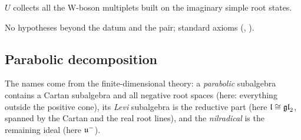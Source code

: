 \begin{physics}$U$ collects all the W-boson multiplets built on the imaginary simple root states.\end{physics}
\begin{status}No hypotheses beyond the datum and the pair; standard axioms (,
).\end{status}

\subsection{Parabolic decomposition}

The names come from the finite-dimensional theory: a \emph{parabolic} subalgebra contains a Cartan subalgebra and all
negative root spaces (here: everything outside the positive cone), its \emph{Levi} subalgebra is the reductive part
(here $\mathfrak{l}\cong\mathfrak{gl}_2$, spanned by the Cartan and the real root lines), and the \emph{nilradical} is the remaining ideal
(here $\mathfrak{u}^-$).

